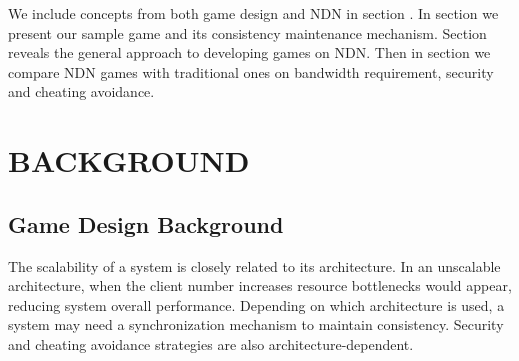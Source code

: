 \documentclass{sigchi}
\begin{document}

We include concepts from both game design and NDN in section . In section  we present our sample game and its consistency maintenance mechanism. Section  reveals the general approach to developing games on NDN. Then in section  we compare NDN games with traditional ones on bandwidth requirement, security and cheating avoidance.





\section{BACKGROUND}
\label{background}


\subsection{Game Design Background}
\label{gamedesignbg}

The scalability of a system is closely related to its architecture. In an unscalable architecture, when the client number increases resource bottlenecks would appear, reducing system overall performance. Depending on which architecture is used, a system may need a synchronization mechanism to maintain consistency. Security and cheating avoidance strategies are also architecture-dependent.
\end{document}

